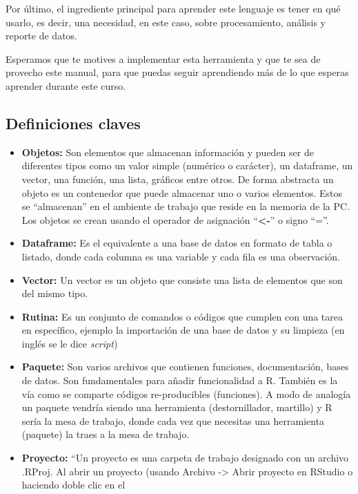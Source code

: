 \documentclass[
  letterpaper,
  DIV=11,
  numbers=noendperiod]{scrreprt}
\begin{document}
Por último, el ingrediente principal para aprender este lenguaje es
tener en qué usarlo, es decir, una necesidad, en este caso, sobre
procesamiento, análisis y reporte de datos.

Esperamos que te motives a implementar esta herramienta y que te sea de
provecho este manual, para que puedas seguir aprendiendo más de lo que
esperas aprender durante este curso.

\subsection{Definiciones claves}\label{definiciones-claves}

\begin{itemize}
\item
  \textbf{Objetos:} Son elementos que almacenan información y pueden ser
  de diferentes tipos como un valor simple (numérico o carácter), un
  dataframe, un vector, una función, una lista, gráficos entre otros. De
  forma abstracta un objeto es un contenedor que puede almacenar uno o
  varios elementos. Estos se ``almacenan'' en el ambiente de trabajo que
  reside en la memoria de la PC. Los objetos se crean usando el operador
  de asignación ``\textbf{\textless-}'' o signo ``=''.
\item
  \textbf{Dataframe:} Es el equivalente a una base de datos en formato
  de tabla o listado, donde cada columna es una variable y cada fila es
  una observación.
\item
  \textbf{Vector:} Un vector es un objeto que consiste una lista de
  elementos que son del mismo tipo.
\item
  \textbf{Rutina:} Es un conjunto de comandos o códigos que cumplen con
  una tarea en específico, ejemplo la importación de una base de datos y
  su limpieza (en inglés se le dice \emph{script})
\item
  \textbf{Paquete:} Son varios archivos que contienen funciones,
  documentación, bases de datos. Son fundamentales para añadir
  funcionalidad a R. También es la vía como se comparte códigos
  re-producibles (funciones). A modo de analogía un paquete vendría
  siendo una herramienta (destornillador, martillo) y R sería la mesa de
  trabajo, donde cada vez que necesitas una herramienta (paquete) la
  traes a la mesa de trabajo.
\item
  \textbf{Proyecto:} ``Un proyecto es una carpeta de trabajo designado
  con un archivo .RProj. Al abrir un proyecto (usando Archivo
  -\textgreater{} Abrir proyecto en RStudio o haciendo doble clic en el

\end{itemize}
\end{document}
